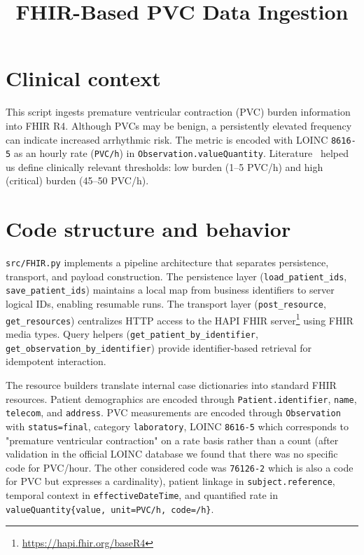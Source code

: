 \documentclass[conference]{IEEEtran}
\begin{document}
\title{FHIR-Based PVC Data Ingestion}
\author{}
\date{}
\maketitle

\section{Clinical context}
This script ingests premature ventricular contraction (PVC)  
burden information into FHIR R4. Although PVCs may be benign, a persistently elevated 
frequency can indicate increased arrhythmic risk. The metric is encoded with 
LOINC \texttt{8616-5} as an hourly rate (\texttt{PVC/h}) in 
\texttt{Observation.valueQuantity}. Literature~\cite{doi:10.1161/CIRCULATIONAHA.119.042434,webmd_pvc_2023}
helped us define clinically relevant thresholds:
low burden (1--5 PVC/h) and high (critical) burden (45--50 PVC/h).

\section{Code structure and behavior}
\texttt{src/FHIR.py} implements a pipeline architecture that separates 
persistence, transport, and payload construction. The persistence layer 
(\texttt{load\_patient\_ids}, \texttt{save\_patient\_ids}) maintains a 
local map from business identifiers to server logical IDs, enabling 
resumable runs. The transport layer (\texttt{post\_resource}, 
\texttt{get\_resources}) centralizes HTTP access to the HAPI FHIR 
server\footnote{\url{https://hapi.fhir.org/baseR4}} using FHIR media types. 
Query helpers (\texttt{get\_patient\_by\_identifier}, 
\texttt{get\_observation\_by\_identifier}) provide identifier-based 
retrieval for idempotent interaction.

The resource builders translate internal case dictionaries into 
standard FHIR resources. Patient demographics are encoded through 
\texttt{Patient.identifier}, \texttt{name}, \texttt{telecom}, and 
\texttt{address}. PVC measurements are encoded through \texttt{Observation} 
with \texttt{status=final}, category \texttt{laboratory}, LOINC \texttt{8616-5} which 
corresponds to "premature ventricular contraction" on a rate basis rather than a count (after validation in the official LOINC database we found that there was no specific 
  code for PVC/hour. The other considered code was \texttt{76126-2} which is 
  also a code for PVC but expresses a cardinality), 
patient linkage in \texttt{subject.reference}, temporal context in 
\texttt{effectiveDateTime}, and quantified rate in \texttt{valueQuantity\{value, unit=PVC/h, code=/h\}}.
\end{document}
